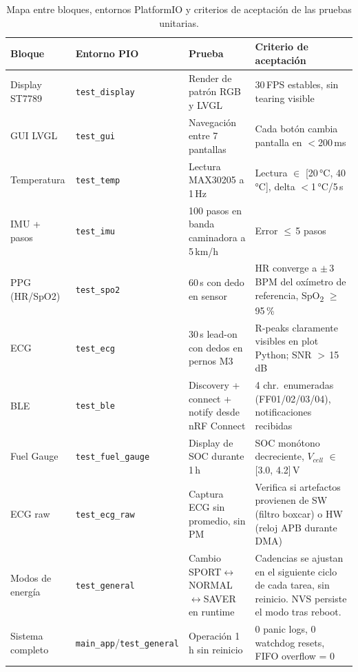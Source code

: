 \documentclass[letterpaper,11pt]{article}
\begin{document}
\begin{table}[H]
    \centering
    \caption{Mapa entre bloques, entornos PlatformIO y criterios de aceptación de las pruebas
    unitarias.}
    \label{tab:envs}
    \footnotesize
    \begin{tabular}{|L{2.6cm}|L{2.6cm}|L{4.0cm}|L{5.0cm}|}\hline
    \textbf{Bloque}     & \textbf{Entorno PIO}      & \textbf{Prueba}                                & \textbf{Criterio de aceptación} \\\hline
    Display ST7789      & \texttt{test\_display}     & Render de patrón RGB y LVGL                    & 30\,FPS estables, sin tearing visible \\\hline
    GUI LVGL            & \texttt{test\_gui}         & Navegación entre 7 pantallas                   & Cada botón cambia pantalla en $<$200\,ms \\\hline
    Temperatura         & \texttt{test\_temp}        & Lectura MAX30205 a 1\,Hz                       & Lectura $\in$ [20\,°C, 40\,°C], delta $<$1\,°C/5\,s \\\hline
    IMU + pasos         & \texttt{test\_imu}         & 100 pasos en banda caminadora a 5\,km/h        & Error $\leq$\,5 pasos \\\hline
    PPG (HR/SpO2)       & \texttt{test\_spo2}        & 60\,s con dedo en sensor                       & HR converge a $\pm$\,3\,BPM del oxímetro de referencia, SpO\textsubscript{2} $\geq$\,95\,\% \\\hline
    ECG                 & \texttt{test\_ecg}         & 30\,s lead-on con dedos en pernos M3           & R-peaks claramente visibles en plot Python; SNR $>$\,15\,dB \\\hline
    BLE                 & \texttt{test\_ble}         & Discovery + connect + notify desde nRF Connect & 4 chr.\ enumeradas (FF01/02/03/04), notificaciones recibidas \\\hline
    Fuel Gauge          & \texttt{test\_fuel\_gauge} & Display de SOC durante 1\,h                    & SOC monótono decreciente, $V_{cell}$ $\in$ [3.0, 4.2]\,V \\\hline
    ECG raw             & \texttt{test\_ecg\_raw}    & Captura ECG sin promedio, sin PM               & Verifica si artefactos provienen de SW (filtro boxcar) o HW (reloj APB durante DMA) \\\hline
    Modos de energía    & \texttt{test\_general}      & Cambio SPORT$\leftrightarrow$NORMAL$\leftrightarrow$SAVER en runtime & Cadencias se ajustan en el siguiente ciclo de cada tarea, sin reinicio. NVS persiste el modo tras reboot. \\\hline
    Sistema completo    & \texttt{main\_app}/\texttt{test\_general} & Operación 1\,h sin reinicio        & 0 panic logs, 0 watchdog resets, FIFO overflow = 0 \\\hline
    \end{tabular}
\end{table}
\end{document}
